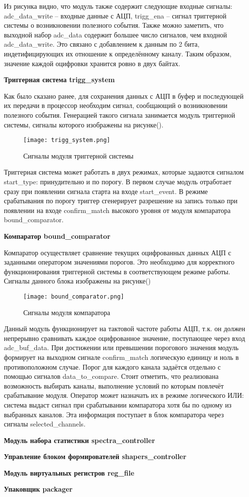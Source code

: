 Из рисунка видно, что модуль также содержит следующие входные сигналы: adc\_data\_write -- входные данные с АЦП, trigg\_ena -- сигнал триггерной системы о возникновении полезного события. Также можно заметить, что выходной набор adc\_data содержит большее число сигналов, чем входной adc\_data\_write. Это связано с добавлением к данным по 2 бита, индетифицирующих их отношение к определённому каналу. Таким образом, значение каждой оцифровки хранится ровно в двух байтах.\par
\textbf{Триггерная система trigg\_system}\par
Как было сказано ранее, для сохранения данных с АЦП в буфер и последующей их передачи в процессор необходим сигнал, сообщающий о возникновении полезного события. Генерацией такого сигнала занимается модуль триггерной системы, сигналы которого изображены на рисунке().\par
\begin{figure}[ht]
    \centering
    \texttt{[image: trigg\_system.png]}
    \caption{Сигналы модуля триггерной системы}
    \label{fig:mpr}
\end{figure}
Триггерная система может работать в двух режимах, которые задаются сигналом start\_type: принудительно и по порогу. В первом случае модуль отработает сразу при появлении сигнала старта на входе start\_event. В режиме срабатывания по порогу триггер сгенерирует разрешение на запись только при появлении на входе confirm\_match высокого уровня от модуля компаратора bound\_comparator.\par
\textbf{Компаратор bound\_comparator}\par
Компаратор осуществляет сравнение текущих оцифрованных данных АЦП с заданными оператором значениями порогов. Это необходимо для корректного функционирования триггерной системы в соответствующем режиме работы. Сигналы данного блока изображены на рисунке()\par
\begin{figure}[ht]
    \centering
    \texttt{[image: bound\_comparator.png]}
    \caption{Сигналы модуля компаратора}
    \label{fig:mpr}
\end{figure}
Данный модуль функционирует на тактовой частоте работы АЦП, т.к. он должен непрерывно сравнивать каждое оцифрованное значение, поступающее через вход adc\_buf\_data. При достижении или превышении порогового значения модуль формирует на выходном сигнале confirm\_match логическую единицу и ноль в противоположном случае. Порог для каждого канала задаётся отдельно с помощью сигналов data\_to\_compare. Стоит отметить, что реализована возможность выбирать каналы, выполнение условий по которым повлечёт срабатывание модуля. Оператор может назначать их в режиме логического ИЛИ: система выдаст сигнал при срабатывании компаратора хотя бы по одному из выбранных каналов. Эта информация поступает в блок компаратора через сигналы selected\_channels.\par
\textbf{Модуль набора статистики spectra\_controller}\par
\textbf{Управление блоком формирователей shapers\_controller}\par
\textbf{Модуль виртуальных регистров reg\_file}\par
\textbf{Упаковщик packager}\par
